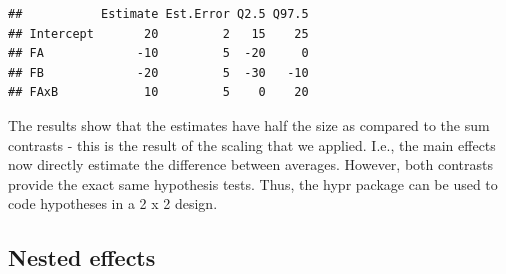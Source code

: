 \documentclass[12pt,]{krantz}
\newenvironment{Shaded}{\begin{snugshade}}{\end{snugshade}}
\newcommand{\DataTypeTok}[1]{\textcolor[rgb]{0.13,0.29,0.53}{#1}}
\newcommand{\DecValTok}[1]{\textcolor[rgb]{0.00,0.00,0.81}{#1}}
\newcommand{\KeywordTok}[1]{\textcolor[rgb]{0.13,0.29,0.53}{\textbf{#1}}}
\newcommand{\NormalTok}[1]{#1}
\newcommand{\OperatorTok}[1]{\textcolor[rgb]{0.81,0.36,0.00}{\textbf{#1}}}
\newcommand{\StringTok}[1]{\textcolor[rgb]{0.31,0.60,0.02}{#1}}
\theoremstyle{definition}
\theoremstyle{definition}
\theoremstyle{definition}
\theoremstyle{remark}
\begin{document}
\begin{Shaded}
\end{Shaded}

\begin{verbatim}
##           Estimate Est.Error Q2.5 Q97.5
## Intercept       20         2   15    25
## FA             -10         5  -20     0
## FB             -20         5  -30   -10
## FAxB            10         5    0    20
\end{verbatim}

The results show that the estimates have half the size as compared to the sum contrasts - this is the result of the scaling that we applied. I.e., the main effects now directly estimate the difference between averages. However, both contrasts provide the exact same hypothesis tests. Thus, the hypr package can be used to code hypotheses in a 2 x 2 design.

\hypertarget{nestedEffects}{%
\subsection{Nested effects}\label{nestedEffects}}
\end{document}
